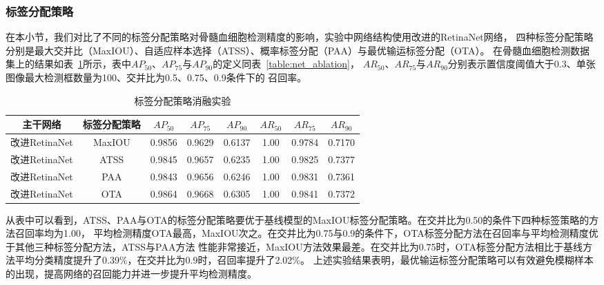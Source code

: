 \subsubsection{标签分配策略}
在本小节，我们对比了不同的标签分配策略对骨髓血细胞检测精度的影响，实验中网络结构使用改进的RetinaNet网络，
四种标签分配策略分别是最大交并比（MaxIOU）、自适应样本选择（ATSS）、概率标签分配（PAA）与最优输运标签分配（OTA）。
在骨髓血细胞检测数据集上的结果如表~\ref{table:assign_ablation}所示，表中$AP_{50}$、$AP_{75}$与$AP_{90}$的定义同表~\ref{table:net_ablation}，
$AR_{50}$、$AR_{75}$与$AR_{90}$分别表示置信度阈值大于0.3、单张图像最大检测框数量为100、交并比为0.5、0.75、0.9条件下的
召回率。
\begin{table}[htbp]
  \caption{标签分配策略消融实验}   
  \centering 
  \label{table:assign_ablation}
  \begin{tabular*}{1.0\hsize}{@{}@{\extracolsep{\fill}}cccccccc@{}}
    \toprule[1pt]
    主干网络  & 标签分配策略 & $AP_{50}$ & $AP_{75}$ & $AP_{90}$ & $AR_{50}$ & $AR_{75}$ & $AR_{90}$ \\
    \midrule[1pt] 
    改进RetinaNet    & MaxIOU & 0.9856 & 0.9629 &  0.6137  & 1.00   & 0.9784 & 0.7170 \\
    改进RetinaNet    & ATSS   & 0.9845 & 0.9657 &  0.6235  & 1.00   & 0.9825 & 0.7377\\ 
    改进RetinaNet    & PAA    & 0.9843 & 0.9656 &  0.6246  & 1.00   & 0.9831 & 0.7361 \\ 
    改进RetinaNet    & OTA    & 0.9864 & 0.9668 &  0.6305  & 1.00   & 0.9841 & 0.7372 \\ 
    \bottomrule[1pt]      
  \end{tabular*} 
\end{table}

从表中可以看到，ATSS、PAA与OTA的标签分配策略要优于基线模型的MaxIOU标签分配策略。在交并比为0.50的条件下四种标签策略的方法召回率均为1.00，
平均检测精度OTA最高，MaxIOU次之。在交并比为0.75与0.9的条件下，OTA标签分配方法在召回率与平均检测精度优于其他三种标签分配方法，ATSS与PAA方法
性能非常接近，MaxIOU方法效果最差。在交并比为0.75时，OTA标签分配方法相比于基线方法平均分类精度提升了0.39\%，在交并比为0.9时，召回率提升了2.02\%。
上述实验结果表明，最优输运标签分配策略可以有效避免模糊样本的出现，提高网络的召回能力并进一步提升平均检测精度。

